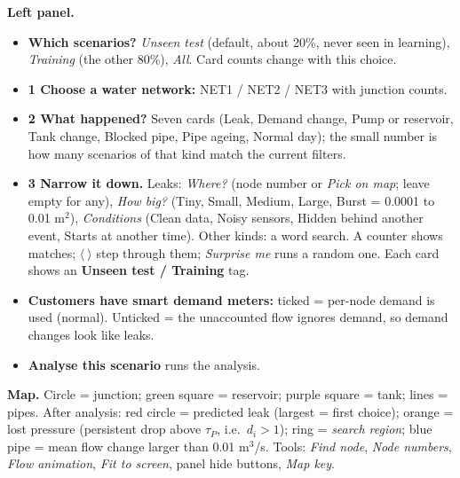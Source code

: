 \documentclass[11pt,a4paper]{article}
\begin{document}
\textbf{Left panel.}
\begin{itemize}
\item \textbf{Which scenarios?} \emph{Unseen test} (default, about 20\%, never seen in learning), \emph{Training} (the other 80\%), \emph{All}. Card counts change with this choice.
\item \textbf{1 Choose a water network:} NET1 / NET2 / NET3 with junction counts.
\item \textbf{2 What happened?} Seven cards (Leak, Demand change, Pump or reservoir, Tank change, Blocked pipe, Pipe ageing, Normal day); the small number is how many scenarios of that kind match the current filters.
\item \textbf{3 Narrow it down.} Leaks: \emph{Where?} (node number or \emph{Pick on map}; leave empty for any), \emph{How big?} (Tiny, Small, Medium, Large, Burst = 0.0001 to 0.01 m$^2$), \emph{Conditions} (Clean data, Noisy sensors, Hidden behind another event, Starts at another time). Other kinds: a word search. A counter shows matches; $\langle\ \rangle$ step through them; \emph{Surprise me} runs a random one. Each card shows an \textbf{Unseen test / Training} tag.
\item \textbf{Customers have smart demand meters:} ticked = per-node demand is used (normal). Unticked = the unaccounted flow ignores demand, so demand changes look like leaks.
\item \textbf{Analyse this scenario} runs the analysis.
\end{itemize}
\textbf{Map.} Circle = junction; green square = reservoir; purple square = tank; lines = pipes. After analysis: \textcolor{red!70!black}{red circle} = predicted leak (largest = first choice); orange = lost pressure (persistent drop above $\tau_P$, i.e.\ $d_i>1$); ring = \emph{search region}; blue pipe = mean flow change larger than 0.01 m$^3$/s. Tools: \emph{Find node}, \emph{Node numbers}, \emph{Flow animation}, \emph{Fit to screen}, panel hide buttons, \emph{Map key}.
\end{document}
